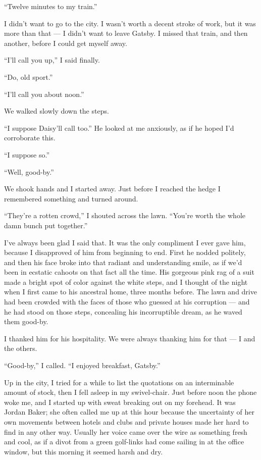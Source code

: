 \documentclass{znotebook}
\begin{document}
``Twelve minutes to my train.''

I didn't want to go to the city. I wasn't worth a decent stroke of work, but it was more than that ---{} I didn't want to leave Gatsby. I missed that train, and then another, before I could get myself away.

``I'll call you up,'' I said finally.

``Do, old sport.''

``I'll call you about noon.''

We walked slowly down the steps.

``I suppose Daisy'll call too.'' He looked at me anxiously, as if he hoped I'd corroborate this.

``I suppose so.''

``Well, good-by.''

We shook hands and I started away. Just before I reached the hedge I remembered something and turned around.

``They're a rotten crowd,'' I shouted across the lawn. ``You're worth the whole damn bunch put together.''

I've always been glad I said that. It was the only compliment I ever gave him, because I disapproved of him from beginning to end. First he nodded politely, and then his face broke into that radiant and understanding smile, as if we'd been in ecstatic cahoots on that fact all the time. His gorgeous pink rag of a suit made a bright spot of color against the white steps, and I thought of the night when I first came to his ancestral home, three months before. The lawn and drive had been crowded with the faces of those who guessed at his corruption ---{} and he had stood on those steps, concealing his incorruptible dream, as he waved them good-by.

I thanked him for his hospitality. We were always thanking him for that ---{} I and the others.

``Good-by,'' I called. ``I enjoyed breakfast, Gatsby.''

Up in the city, I tried for a while to list the quotations on an interminable amount of stock, then I fell asleep in my swivel-chair. Just before noon the phone woke me, and I started up with sweat breaking out on my forehead. It was Jordan Baker; she often called me up at this hour because the uncertainty of her own movements between hotels and clubs and private houses made her hard to find in any other way. Usually her voice came over the wire as something fresh and cool, as if a divot from a green golf-links had come sailing in at the office window, but this morning it seemed harsh and dry.
\end{document}
